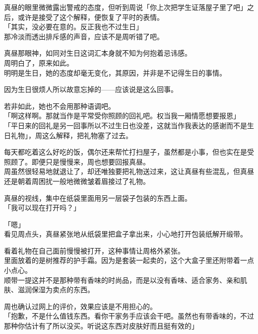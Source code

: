 真昼的眼里微微露出警戒的态度，但听到周说「你上次把学生证落屋子里了吧」之后，或许是接受了这个解释，便恢复了平时的表情。\\

「其实，没必要在意的。反正我也不过生日」\\

那冷淡而透出排斥感的声音，应该不是周听错了吧。

真昼那眼神，如同对生日这词汇本身就不知为何抱着忌讳感。\\

周明白了，原来如此。\\

明明是生日，她的态度却毫无变化，其原因，并非是不记得生日的事情。

因为生日很烦人所以故意忘掉的——应该说是这么回事。

若非如此，她也不会用那种语调吧。\\

「啊这样啊。那就当作是平常受你照顾的回礼吧。权当我一厢情愿想要报恩」\\

「平日来的回礼是另一回事所以不过生日也没差，这就当作我表达的感谢而不是生日礼物」，周这么解释，把礼物塞了过去。

每天都吃着这么好吃的饭，偶尔还来帮忙打扫屋子，虽然都是小事，但也实在是受照顾了。即便只是慢慢来，周也想要回报真昼。\\

周虽然很轻易地就退让了，却还唯独要把礼物送过来，这让真昼有些混乱，但真昼还是朝着周困扰一般地微微皱着眉接过了礼物。

真昼的视线，集中在纸袋里面用另一层袋子包装的东西上面。\\

「我可以现在打开吗？」

「嗯」\\

看见周点头，真昼紧张地从纸袋里把盒子拿出来，小心地打开包装纸解开缎带。

看着礼物在自己面前慢慢被打开，这种事情让周格外紧张。\\

里面放着的是树推荐的护手霜。因为是套装一起卖的，这个大盒子里还附带着一点小点心。\\

顺带一提这并不是那种带有香味的时尚品，而是以没有香味、适合家务、亲和肌肤、滋润保湿为卖点的东西。

周也确认过网上的评价，效果应该是不用担心的。\\

「抱歉，不是什么值钱东西。看你干家务手应该会干吧。虽然也有带香味的，不过那种你估计有了所以没买。听说这东西对皮肤好而且挺有效的」

